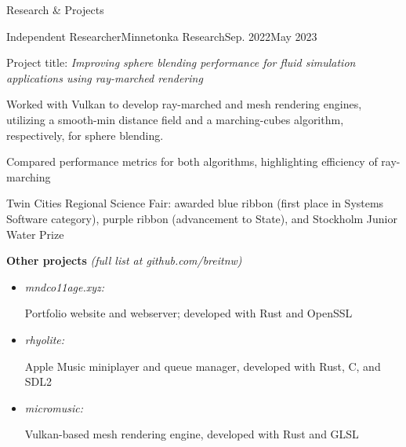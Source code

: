 \documentclass{resume} %
\begin{document}
\begin{rSection}{Research \& Projects}
  \begin{rItem}{Independent Researcher}{Minnetonka Research}{Sep. 2022}{May 2023}
    \item Project title: {\em Improving sphere blending performance for fluid simulation applications using ray-marched rendering}
    \item Worked with Vulkan to develop ray-marched and mesh rendering engines, utilizing a smooth-min distance field and a marching-cubes algorithm, respectively, for sphere blending.
    \item Compared performance metrics for both algorithms, highlighting efficiency of ray-marching
    \item Twin Cities Regional Science Fair: awarded blue ribbon (first place in Systems Software category), purple ribbon (advancement to State), and Stockholm Junior Water Prize
  \end{rItem}

  {\bf Other projects} {\em (full list at github.com/breitnw)}
  \begin{itemize}
    \item \parbox{3cm}{\em mndco11age.xyz:} Portfolio website and webserver; developed with Rust and OpenSSL
    \item \parbox{3cm}{\em rhyolite:} Apple Music miniplayer and queue manager, developed with Rust, C, and SDL2
    \item \parbox{3cm}{\em micromusic:} Vulkan-based mesh rendering engine, developed with Rust and GLSL
  \end{itemize}

\end{rSection}

\end{document}
